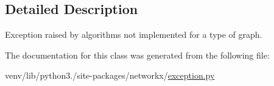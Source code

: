 \subsection{Detailed Description}
\begin{DoxyVerb}Exception raised by algorithms not implemented for a type of graph.\end{DoxyVerb}
 

The documentation for this class was generated from the following file\+:\begin{DoxyCompactItemize}
\item 
venv/lib/python3./site-\/packages/networkx/\hyperlink{exception_8py}{exception.\+py}\end{DoxyCompactItemize}
